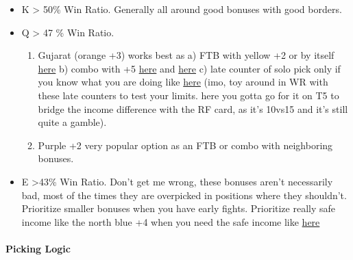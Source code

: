 \begin{itemize}
\begin{enumerate}
        \item The east yellow +4 and orange +2 are just generally good options for safe income. It can work because you have 4 spawns to cover the entire map, as such you can choose to have two cover/counter picks in the center and north + 2 picks east. However, you don't want to end up like \href{https://www.warzone.com/MultiPlayer?GameID=33152504}{here} with 0 options. Also you generally don't want to gamble two picks there vs a light green +2 FTB above it, due to how the +2 Bonus can walk to a double border within a turn.
    \end{enumerate}
    \item K > 50\% Win Ratio. Generally all around good bonuses with good borders.
    \item Q > 47 \% Win Ratio. 
    \begin{enumerate}
        \item Gujarat (orange +3) works best as a) FTB  with yellow +2 or by itself \href{https://www.warzone.com/MultiPlayer?GameID=39455294}{here} b) combo with +5 \href{https://www.warzone.com/MultiPlayer?GameID=38248903}{here} and \href{https://www.warzone.com/MultiPlayer?GameID=33795634}{here} c) late counter of solo pick only if you know what you are doing like \href{https://www.warzone.com/MultiPlayer?GameID=33003584}{here} (imo, toy around in WR with these late counters to test your limits. here you gotta go for it on T5 to bridge the income difference with the RF card, as it's 10vs15 and it's still quite a gamble).
        \item Purple +2 very popular option as an FTB or combo with neighboring bonuses.
    \end{enumerate}
    \item E >43\% Win Ratio. Don't get me wrong, these bonuses aren't necessarily bad, most of the times they are overpicked in positions where they shouldn't. Prioritize smaller bonuses when you have early fights. Prioritize really safe income like the north blue +4 when you need the safe income like \href{https://www.warzone.com/MultiPlayer?GameID=39978166}{here}
\end{itemize}

\paragraph{Picking Logic}

